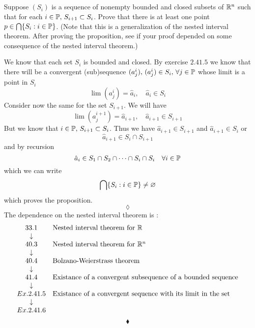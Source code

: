 \subsection{}
\begin{tcolorbox}
Suppose $(S_i)$ is a sequence of nonempty bounded and closed
subsets of $\mathbb{R}^n$ such that for each $i\in \mathbb{P},\, S_{i+1}\subset S_i$. Prove that there
is at least one point $p\in\bigcap\{S_i:i\in \mathbb{P}\}$. (Note that this is a generalization of the nested interval theorem. After proving the proposition, see if your proof depended on some consequence of the nested interval theorem.)
\end{tcolorbox}
We know that each set $S_i$ is bounded and closed. By exercise $2.41.5$ we know that there will be a convergent (sub)sequence $(a^i_j),\, (a^i_j)\in S_i,\, \forall j\in\mathbb{P}$ whose limit
is a point in $S_i$
$$\lim (a^i_j)=\hat{a}_i,\quad \hat{a}_i\in S_i$$
Consider now the same for the set $S_{i+1}$. We will have 
$$\lim (a^{i+1}_j)=\hat{a}_{i+1},\quad\hat{a}_{i+1}\in S_{i+1}$$
But we know that $i\in \mathbb{P},\, S_{i+1}\subset S_i$. Thus we have
$\hat{a}_{i+1}\in S_{i+1}$ and $\hat{a}_{i+1}\in S_{i}$ or 
$$\hat{a}_{i+1}\in S_{i}\cap S_{i+1}$$ and by recursion
$$\hat{a}_{i}\in S_1\cap S_2\cap \dots\cap S_{i}\cap S_{i}\quad \forall i\in \mathbb{P}$$
which we can write
$$\bigcap\{S_i:i\in \mathbb{P}\}\neq \varnothing$$ which proves the proposition.
$$\lozenge$$
The dependence on the nested interval theorem is :
\begin{align*}
\begin{array}{c l}
33.1&\text{Nested interval theorem for }\mathbb{R}\\
\downarrow&\\
40.3&\text{Nested interval theorem for }\mathbb{R}^n\\
\downarrow&\\
40.4&\text{Bolzano-Weierstrass theorem}\\
\downarrow&\\
41.4&\text{Existance of a convergent subsequence of a bounded sequence}\\
\downarrow&\\
Ex. 2.41.5&\text{Existance of a convergent sequence with its limit in the set}\\
\downarrow&\\
Ex. 2.41.6&
\end{array}
\end{align*}
$$\blacklozenge$$\\


